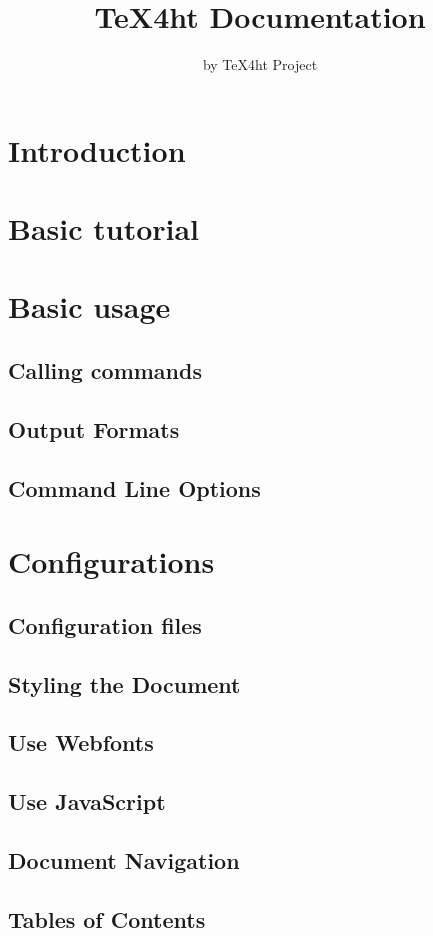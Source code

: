 \documentclass{book}
\title{TeX4ht Documentation}
\author{by TeX4ht Project}
\begin{document}
\maketitle

\tableofcontents

\chapter{Introduction}

\chapter{Basic tutorial}
\chapter{Basic usage}
\section{Calling commands}
\section{Output Formats}
\section{Command Line Options}


\chapter{Configurations}
\section{Configuration files}
\section{Styling the Document}
\section{Use Webfonts}
\section{Use JavaScript}
\section{Document Navigation}
\section{Tables of Contents}
\end{document}
